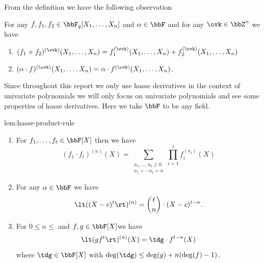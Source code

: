 From the definition we have the following observation
\begin{observation}
  For any $f,f_1,f_2\in\bbF_q[X_1,\dots, X_n]$ and $\alpha\in\bbF$ and for any $\ovk\in\bbZ^n$ we have\begin{enumerate}[label=(\roman*)]
    \item $(f_1+f_2)^{(\ovk)}(X_1,\dots, X_n)=f_1^{(\ovk)}(X_1,\dots, X_n)+f_2^{(\ovk)}(X_1,\dots, X_n)$
    \item $(\alpha\cdot f)^{(\ovk)}(X_1,\dots, X_n)=\alpha\cdot f^{(\ovk)}(X_1,\dots, X_n)$.
  \end{enumerate}
\end{observation}
Since throughout this report we only use hasse derivatives in the context of univariate polynomials we will only focus on univariate polynomials and see some properties of hasse derivatives. Here we take $\bbF$ to be any field.
\begin{lemma}{}{lem:hasse-product-rule}
  \begin{enumerate}[label=(\roman*)]
    \item For $f_1,\dots, f_t\in\bbF[X]$ then we have $$(f_1\cdot f_t)^{(n)}(X)=\sum_{\substack{n_1,\dots, n_t\geq 0\\ n_1+\cdots n_t=n}}\prod_{i=1}^tf_i^{(n_i)}(X)$$ 
    \item For any $\alpha\in\bbF$ we have $$\lt((X-c)^t\rt)^{(n)}=\binom{t}n\cdot (X-c)^{t-n}.$$  
    \item For $0\leq n\leq $ and $f,g\in \bbF[X]$we have $$\lt(gf^t\rt)^{(n)}(X)=\tdg\cdot f^{t-n}(X)$$ where $\tdg\in\bbF[X]$ with $\deg(\tdg)\leq \deg(g)+n(\deg(f)-1)$.  
  \end{enumerate}
\end{lemma}
